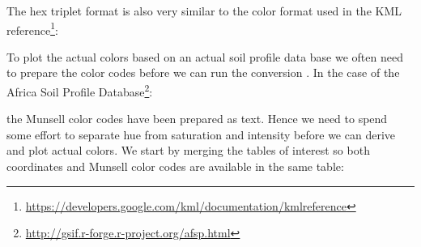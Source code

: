 \documentclass[graybox,natbib,nospthms,UStrade]{svmono}
\newenvironment{Shaded}{\begin{snugshade}}{\end{snugshade}}
\newcommand{\CommentTok}[1]{\textcolor[rgb]{0.37,0.37,0.37}{\textit{#1}}}
\newcommand{\KeywordTok}[1]{\textcolor[rgb]{0.27,0.27,0.27}{\textbf{#1}}}
\newcommand{\NormalTok}[1]{#1}
\newcommand{\OperatorTok}[1]{\textcolor[rgb]{0.43,0.43,0.43}{\textbf{#1}}}
\newcommand{\StringTok}[1]{\textcolor[rgb]{0.5,0.5,0.5}{#1}}
\renewcommand{\href}[2]{#2 (\url{#1})}
\renewcommand{\href}[2]{#2\footnote{\url{#1}}}
\begin{document}
The hex triplet format is also very similar to the color format used in the \href{https://developers.google.com/kml/documentation/kmlreference}{KML reference}:

\begin{Shaded}
\end{Shaded}

To plot the actual colors based on an actual soil profile data base we often need to prepare the color codes before we can run the conversion \citep{VISCARRAROSSEL2006320}. In the case of the \href{http://gsif.r-forge.r-project.org/afsp.html}{Africa Soil Profile Database}:

\begin{Shaded}
\end{Shaded}

the Munsell color codes have been prepared as text. Hence we need to spend some effort to separate hue from saturation and intensity before we can derive and plot actual colors. We start by merging the tables of interest so both coordinates and Munsell color codes are available in the same table:
\end{document}
